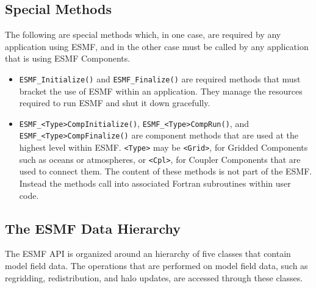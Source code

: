 \subsection{Special Methods}

The following are special methods which, in one case,
are required by any application using ESMF, and in the 
other case must be called by any application that is using 
ESMF Components.

\begin{itemize}

\item {\tt ESMF\_Initialize()} and {\tt ESMF\_Finalize()} are required 
methods that must bracket the use of ESMF within an application.  
They manage the resources required to run ESMF and shut it down
gracefully.
\item {\tt ESMF\_<Type>CompInitialize()}, {\tt ESMF\_<Type>CompRun()}, and 
{\tt ESMF\_<Type>CompFinalize()} are component methods that are used at the 
highest level within ESMF.  {\tt <Type>} may be {\tt <Grid>}, for 
Gridded Components such as oceans or atmospheres, or
{\tt <Cpl>}, for Coupler Components that are used to connect 
them.  The content of these methods is not part of the ESMF.  
Instead the methods call into associated Fortran subroutines within 
user code.

\end{itemize}

\subsection{The ESMF Data Hierarchy}

The ESMF API is organized around an hierarchy of five classes that 
contain model field data.  The operations that are performed
on model field data, such as regridding, redistribution, and halo 
updates, are accessed through these classes.  

